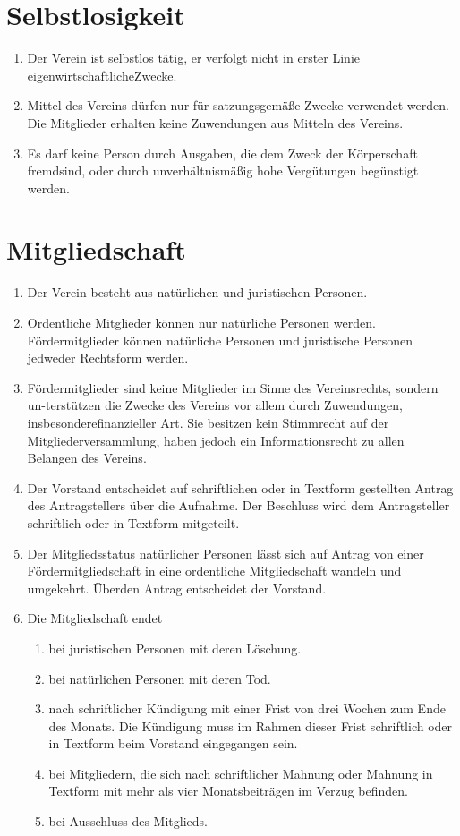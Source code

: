\documentclass[a4paper, 12pt]{scrartcl}
\begin{document}
\section{Selbstlosigkeit}

\begin{enumerate}
  \item Der Verein ist selbstlos tätig, er verfolgt nicht in erster Linie eigenwirtschaftlicheZwecke.
  \item Mittel des Vereins dürfen nur für satzungsgemäße Zwecke verwendet werden. Die Mitglieder erhalten keine Zuwendungen aus Mitteln des Vereins.
  \item Es darf keine Person durch Ausgaben, die dem Zweck der Körperschaft fremdsind, oder durch unverhältnismäßig hohe Vergütungen begünstigt werden.
\end{enumerate}

\section{Mitgliedschaft}
\begin{enumerate}
  \item Der Verein besteht aus natürlichen und juristischen Personen.
  \item Ordentliche Mitglieder können nur natürliche Personen werden. Fördermitglieder können natürliche Personen und juristische Personen jedweder Rechtsform werden.
  \item Fördermitglieder sind keine Mitglieder im Sinne des Vereinsrechts, sondern un-terstützen die Zwecke des Vereins vor allem durch Zuwendungen, insbesonderefinanzieller Art. Sie besitzen kein Stimmrecht auf der Mitgliederversammlung, haben jedoch ein Informationsrecht zu allen Belangen des Vereins.
  \item Der Vorstand entscheidet auf schriftlichen oder in Textform gestellten Antrag des Antragstellers über die Aufnahme. Der Beschluss wird dem Antragsteller schriftlich oder in Textform mitgeteilt.
  \item Der Mitgliedsstatus natürlicher Personen lässt sich auf Antrag von einer Fördermitgliedschaft in eine ordentliche Mitgliedschaft wandeln und umgekehrt. Überden Antrag entscheidet der Vorstand.
  \item Die Mitgliedschaft endet
  \begin{enumerate}
    \item bei juristischen Personen mit deren Löschung.
    \item bei natürlichen Personen mit deren Tod.
    \item nach schriftlicher Kündigung mit einer Frist von drei Wochen zum Ende des Monats. Die Kündigung muss im Rahmen dieser Frist schriftlich oder in Textform beim Vorstand eingegangen sein.
    \item bei Mitgliedern, die sich nach schriftlicher Mahnung oder Mahnung in Textform mit mehr als vier Monatsbeiträgen im Verzug befinden.
    \item bei Ausschluss des Mitglieds.
  \end{enumerate}
\end{enumerate}
\end{document}
